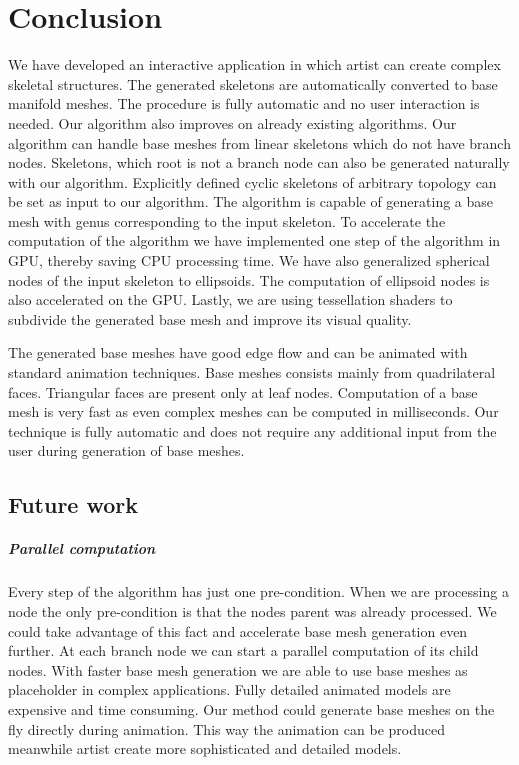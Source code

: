 \chapter{Conclusion}

We have developed an interactive application in which artist can create complex skeletal structures.
The generated skeletons are automatically converted to base manifold meshes.
The procedure is fully automatic and no user interaction is needed.
Our algorithm also improves on already existing algorithms.
Our algorithm can handle base meshes from linear skeletons which do not have branch nodes.
Skeletons, which root is not a branch node can also be generated naturally with our algorithm.
Explicitly defined cyclic skeletons of arbitrary topology can be set as input to our algorithm.
The algorithm is capable of generating a base mesh with genus corresponding to the input skeleton.
To accelerate the computation of the algorithm we have implemented one step of the algorithm in GPU, thereby saving CPU processing time.
We have also generalized spherical nodes of the input skeleton to ellipsoids.
The computation of ellipsoid nodes is also accelerated on the GPU.
Lastly, we are using tessellation shaders to subdivide the generated base mesh and improve its visual quality.

The generated base meshes have good edge flow and can be animated with standard animation techniques.
Base meshes consists mainly from quadrilateral faces.
Triangular faces are present only at leaf nodes.
Computation of a base mesh is very fast as even complex meshes can be computed in milliseconds.
Our technique is fully automatic and does not require any additional input from the user during generation of base meshes.

\section{Future work}

\paragraph{Parallel computation}
Every step of the algorithm has just one pre-condition.
When we are processing a node the only pre-condition is that the nodes parent was already processed.
We could take advantage of this fact and accelerate base mesh generation even further.
At each branch node we can start a parallel computation of its child nodes.
With faster base mesh generation we are able to use base meshes as placeholder in complex applications.
Fully detailed animated models are expensive and time consuming.
Our method could generate base meshes on the fly directly during animation.
This way the animation can be produced meanwhile artist create more sophisticated and detailed models.

